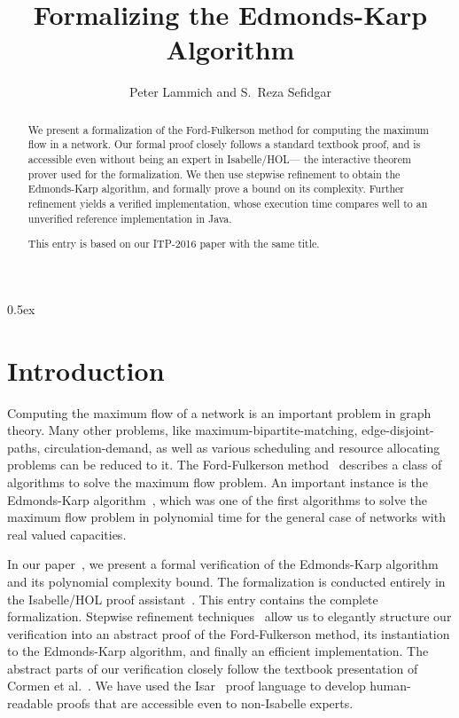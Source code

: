 \documentclass[11pt,a4paper]{article}
\begin{document}
\title{Formalizing the Edmonds-Karp Algorithm}
\author{Peter Lammich and S.~Reza Sefidgar}
\maketitle

\begin{abstract}
We present a formalization of the Ford-Fulkerson method for computing the maximum flow in a network.
Our formal proof closely follows a standard textbook proof, and is accessible even without being
an expert in Isabelle/HOL--- the interactive theorem prover used for the formalization.
We then use stepwise refinement to obtain the Edmonds-Karp algorithm, and formally prove a bound on its complexity.
Further refinement yields a verified implementation, whose execution time compares well to an unverified reference implementation in Java.

This entry is based on our ITP-2016 paper with the same title.
\end{abstract}

\clearpage
\tableofcontents

\clearpage

\parindent 0pt\parskip 0.5ex

\section{Introduction}
Computing the maximum flow of a network is an important problem in graph theory.
Many other problems, like maximum-bipartite-matching, edge-disjoint-paths,
circulation-demand, as well as various scheduling and resource allocating
problems can be reduced to it. The Ford-Fulkerson method~\cite{FF56} describes a
class of algorithms to solve the maximum flow problem. An important instance is
the Edmonds-Karp algorithm~\cite{EK72}, which was one of the first algorithms to
solve the maximum flow problem in polynomial time for the general case of
networks with real valued capacities.

In our paper~\cite{LaSe16}, we present a formal verification of the Edmonds-Karp algorithm
and its polynomial complexity bound. The formalization is conducted entirely in
the Isabelle/HOL proof assistant~\cite{NPW02}. This entry contains the complete formalization.
Stepwise refinement
techniques~\cite{Wirth71,Back78,BaWr98} allow us to elegantly structure our
verification into an abstract proof of the Ford-Fulkerson method, its
instantiation to the Edmonds-Karp algorithm, and finally an efficient
implementation. The abstract parts of our verification closely follow the
textbook presentation of Cormen et al.~\cite{CLRS09}. We have used the
Isar~\cite{Wenzel99} proof language to develop human-readable proofs that are 
accessible even to non-Isabelle experts.
\end{document}
